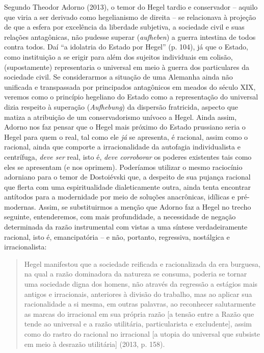 Segundo Theodor Adorno (2013), o temor do Hegel tardio e conservador --
aquilo que viria a ser derivado como hegelianismo de direita -- se
relacionava à projeção de que a esfera por excelência da liberdade
subjetiva, a sociedade civil e suas relações antagônicas, não pudesse
superar (\emph{aufheben}) a guerra intestina de todos contra todos. Daí
``a idolatria do Estado por Hegel'' (p. 104), já que o Estado, como
instituição a se erigir para além dos sujeitos individuais em colisão,
(supostamente) representaria o universal em meio à guerra dos
particulares da sociedade civil. Se considerarmos a situação de uma
Alemanha ainda não unificada e transpassada por principados antagônicos
em meados do século XIX, veremos como o princípio hegeliano do Estado
como a representação do universal dizia respeito à superação
(\emph{Aufhebung}) da dispersão fratricida, aspecto que matiza a
atribuição de um conservadorismo unívoco a Hegel. Ainda assim, Adorno
nos faz pensar que o Hegel mais próximo do Estado prussiano seria o
Hegel para quem o real, tal como ele \emph{já} se apresenta, é racional,
assim como o racional, ainda que comporte a irracionalidade da autofagia
individualista e centrífuga, \emph{deve ser} real, isto é, \emph{deve
corroborar} os poderes existentes tais como eles se apresentam (e nos
oprimem). Poderíamos utilizar o mesmo raciocínio adorniano para o temor
de Dostoiévski que, a despeito de sua pujança racional que flerta com
uma espiritualidade dialeticamente outra, ainda tenta encontrar
antítodos para a modernidade por meio de soluções anacrônicas, idílicas
e pré-modernas. Assim, se substituirmos a menção que Adorno faz a Hegel
no trecho seguinte, entenderemos, com mais profundidade, a necessidade
de negação determinada da razão instrumental com vistas a uma síntese
verdadeiramente racional, isto é, emancipatória -- e não, portanto,
regressiva, nostálgica e irracionalista:

\begin{quote}
Hegel manifestou que a sociedade reificada e racionalizada da era
burguesa, na qual a razão dominadora da natureza se consuma, poderia se
tornar uma sociedade digna dos homens, não através da regressão a
estágios mais antigos e irracionais, anteriores à divisão do trabalho,
mas ao aplicar sua racionalidade a si mesma, em outras palavras, ao
reconhecer salutarmente as marcas do irracional em sua própria razão
{[}a tensão entre a Razão que tende ao universal e a razão utilitária,
particularista e excludente{]}, assim como do rastro do racional no
irracional {[}a utopia do universal que subsiste em meio à desrazão
utilitária{]} (2013, p. 158).
\end{quote}


